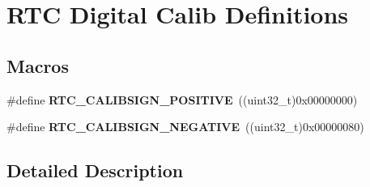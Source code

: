 \hypertarget{group___r_t_c_ex___digital___calibration___definitions}{}\section{R\+TC Digital Calib Definitions}
\label{group___r_t_c_ex___digital___calibration___definitions}
\subsection*{Macros}
\begin{DoxyCompactItemize}
\item 
\#define {\bfseries R\+T\+C\+\_\+\+C\+A\+L\+I\+B\+S\+I\+G\+N\+\_\+\+P\+O\+S\+I\+T\+I\+VE}~((uint32\+\_\+t)0x00000000)\hypertarget{group___r_t_c_ex___digital___calibration___definitions_gab2eaa5626ec9fd04a5d7565cf5553781}{}\label{group___r_t_c_ex___digital___calibration___definitions_gab2eaa5626ec9fd04a5d7565cf5553781}

\item 
\#define {\bfseries R\+T\+C\+\_\+\+C\+A\+L\+I\+B\+S\+I\+G\+N\+\_\+\+N\+E\+G\+A\+T\+I\+VE}~((uint32\+\_\+t)0x00000080)\hypertarget{group___r_t_c_ex___digital___calibration___definitions_gacb3a2435f76aa01634746bd8815bfa4c}{}\label{group___r_t_c_ex___digital___calibration___definitions_gacb3a2435f76aa01634746bd8815bfa4c}

\end{DoxyCompactItemize}


\subsection{Detailed Description}
